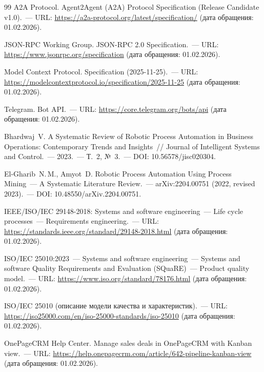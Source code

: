 \begin{thebibliography}{99}
A2A Protocol. Agent2Agent (A2A) Protocol Specification (Release Candidate v1.0).~--- URL: \url{https://a2a-protocol.org/latest/specification/} (дата обращения: 01.02.2026).

JSON-RPC Working Group. JSON-RPC 2.0 Specification.~--- URL: \url{https://www.jsonrpc.org/specification} (дата обращения: 01.02.2026).

Model Context Protocol. Specification (2025-11-25).~--- URL: \url{https://modelcontextprotocol.io/specification/2025-11-25} (дата обращения: 01.02.2026).

Telegram. Bot API.~--- URL: \url{https://core.telegram.org/bots/api} (дата обращения: 01.02.2026).

Bhardwaj~V. A Systematic Review of Robotic Process Automation in Business Operations: Contemporary Trends and Insights~// Journal of Intelligent Systems and Control.~--- 2023.~--- Т.~2, №~3.~--- DOI: 10.56578/jisc020304.

El-Gharib~N.\,M., Amyot~D. Robotic Process Automation Using Process Mining~--- A Systematic Literature Review.~--- arXiv:2204.00751 (2022, revised 2023).~--- DOI: 10.48550/arXiv.2204.00751.

IEEE/ISO/IEC 29148-2018: Systems and software engineering~--- Life cycle processes~--- Requirements engineering.~--- URL: \url{https://standards.ieee.org/standard/29148-2018.html} (дата обращения: 01.02.2026).

ISO/IEC 25010:2023~--- Systems and software engineering~--- Systems and software Quality Requirements and Evaluation (SQuaRE)~--- Product quality model.~--- URL: \url{https://www.iso.org/standard/78176.html} (дата обращения: 01.02.2026).

ISO/IEC 25010 (описание модели качества и характеристик).~--- URL: \url{https://iso25000.com/en/iso-25000-standards/iso-25010} (дата обращения: 01.02.2026).

OnePageCRM Help Center. Manage sales deals in OnePageCRM with Kanban view.~--- URL: \url{https://help.onepagecrm.com/article/642-pipeline-kanban-view} (дата обращения: 01.02.2026).

\end{thebibliography}
